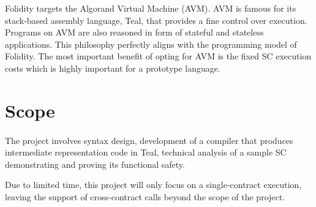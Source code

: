 \documentclass[10pt, a4paper]{article}
\begin{document}
Folidity targets the Algorand Virtual Machine (AVM). AVM is famous for its stack-based assembly language, Teal, that provides a fine control over execution. Programs on AVM are also reasoned in form of stateful and stateless applications. This philosophy perfectly aligns with the programming model of Folidity. The most important benefit of opting for AVM is the fixed SC execution costs which is highly important for a prototype language.

\section*{Scope}
\paragraph{}
The project involves syntax design, development of a compiler that produces intermediate representation code in Teal, technical analysis of a sample SC demonstrating and proving its functional safety.

Due to limited time, this project will only focus on a single-contract execution, leaving the support of cross-contract calls beyond the scope of the project.
\end{document}
